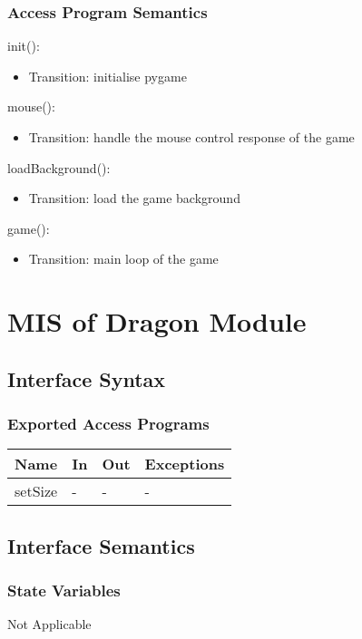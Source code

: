 \documentclass[12,english]{article}
\begin{document}
\subsubsection{Access Program Semantics}

\noindent init():
\begin{itemize}
    \item Transition: initialise pygame
\end{itemize}

\noindent mouse():
\begin{itemize}
    \item Transition: handle the mouse control response of the game
\end{itemize}

\noindent loadBackground():
\begin{itemize}
    \item Transition: load the game background
\end{itemize}

\noindent game():
\begin{itemize}
    \item Transition: main loop of the game
\end{itemize}



\section{MIS of Dragon Module}
\subsection{Interface Syntax}
\subsubsection{Exported Access Programs}
\begin{table}[h!]
    \centering
    \begin{tabular}{|p{4cm}|p{2cm}|p{2cm}|p{2cm}|}
    \hline
    \textbf {Name}  & {In} & {Out} & {Exceptions} \\
    \hline
    setSize & - & - & -\\
    \hline 
    \end{tabular}
\end{table}
\subsection{Interface Semantics}
\subsubsection{State Variables}
Not Applicable 
\end{document}
